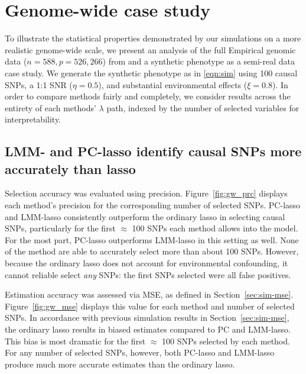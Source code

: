 \section{Genome-wide case study} \label{sec:gw_cs}

To illustrate the statistical properties demonstrated by our simulations on a more realistic genome-wide scale, we present an analysis of the full Empirical genomic data ($n=588, p=526,266$) from \citet{larkin2015objectives} and a synthetic phenotype as a semi-real data case study. We generate the synthetic phenotype as in \eqref{eqn:sim} using 100 causal SNPs, a 1:1 SNR ($\eta = 0.5$), and substantial environmental effects ($\xi = 0.8$). In order to compare methods fairly and completely, we consider results across the entirety of each methods' $\lambda$ path, indexed by the number of selected variables for interpretability.

\subsection{LMM- and PC-lasso identify causal SNPs more accurately than lasso}

Selection accuracy was evaluated using precision.  Figure~\ref{fig:gw_prc} displays each method's precision for the corresponding number of selected SNPs. PC-lasso and LMM-lasso consistently outperform the ordinary lasso in selecting causal SNPs, particularly for the first $\approx$ 100 SNPs each method allows into the model. For the most part, PC-lasso outperforms LMM-lasso in this setting as well. None of the method are able to accurately select more than about 100 SNPs.  However, because the ordinary lasso does not account for environmental confounding, it cannot reliable select \emph{any} SNPs: the first  SNPs selected were all false positives.

Estimation accuracy was assessed via MSE, as defined in Section~\ref{sec:sim-mse}. Figure~\ref{fig:gw_mse} displays this value for each method and number of selected SNPs. In accordance with previous simulation results in Section~\ref{sec:sim-mse}, the ordinary lasso results in biased estimates compared to PC and LMM-lasso. This bias is most dramatic for the first $\approx$ 100 SNPs selected by each method. For any number of selected SNPs, however, both PC-lasso and LMM-lasso produce much more accurate estimates than the ordinary lasso.

